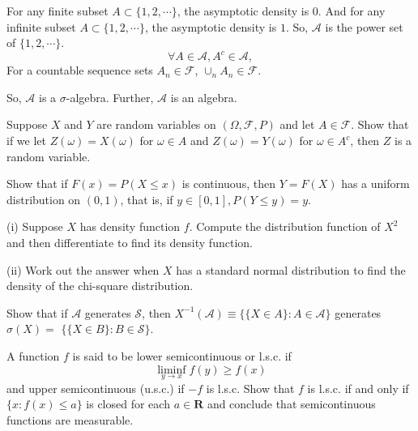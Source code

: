 \documentclass[en, normal, 11pt, black]{elegantnote}
\newenvironment{exercise}[1]{\begin{tcolorbox}[colback=black!15, colframe=black!80, title=#1]}{\end{tcolorbox}}
\newenvironment{solution}{\begin{tcolorbox}[colback=white, colframe=black!50, title=Solution. ]\setlength{\parskip}{0.8em}}{\end{tcolorbox}}
\begin{document}
    \begin{solution}
        For any finite subset $A\subset\{1,2,\cdots\}$, the asymptotic density is $0$. And for any infinite subset $A\subset\{1,2,\cdots\}$, the asymptotic density is $1$. So, $\mathcal{A}$ is the power set of $\{1,2,\cdots\}$. 
        \[\forall A\in \mathcal{A}, A^c\in\mathcal{A}, \] 
        For a countable sequence sets $A_n\in\mathcal{F}$, $\cup_{n}A_n\in\mathcal{F}$. 

        So, $\mathcal{A}$ is a $\sigma$-algebra. Further, $\mathcal{A}$ is an algebra. 
    \end{solution}

    \begin{exercise}{1.2.1}
        Suppose $X$ and $Y$ are random variables on $(\Omega, \mathcal{F}, P)$ and let $A \in \mathcal{F}$. Show that if we let $Z(\omega)=X(\omega)$ for $\omega \in A$ and $Z(\omega)=Y(\omega)$ for $\omega \in A^{c}$, then $Z$ is a random variable.
    \end{exercise}

    \begin{exercise}{1.2.4}
        Show that if $F(x)=P(X \leq x)$ is continuous, then $Y=F(X)$ has a uniform distribution on $(0,1)$, that is, if $y \in[0,1], P(Y \leq y)=y$.
    \end{exercise}

    \begin{exercise}{1.2.7}
        (i) Suppose $X$ has density function $f$. Compute the distribution function of $X^{2}$ and then differentiate to find its density function. 
        
        (ii) Work out the answer when $X$ has a standard normal distribution to find the density of the chi-square distribution. 
    \end{exercise}

    \begin{exercise}{1.3.1}
        Show that if $\mathcal{A}$ generates $\mathcal{S}$, then $X^{-1}(\mathcal{A}) \equiv\{\{X \in A\}: A \in \mathcal{A}\}$ generates $\sigma(X)=$ $\{\{X \in B\}: B \in \mathcal{S}\} .$
    \end{exercise}

    \begin{exercise}{1.3.5}
        A function $f$ is said to be lower semicontinuous or l.s.c. if
        $$
        \liminf _{y \rightarrow x} f(y) \geq f(x)
        $$
        and upper semicontinuous (u.s.c.) if $-f$ is l.s.c. Show that $f$ is l.s.c. if and only if $\{x: f(x) \leq a\}$ is closed for each $a \in \mathbf{R}$ and conclude that semicontinuous functions are measurable.
    \end{exercise}
    
\end{document}
